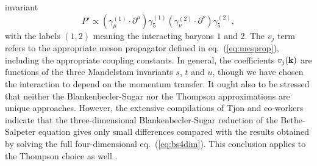 invariant
\begin{equation}
  P'\propto (\gamma_{\mu}^{(1)}\cdot \partial^{\mu})\gamma_5^{(1)}
(\gamma_{\nu}^{(2)}\cdot \partial^{\nu})\gamma_5^{(2)},
\end{equation}
with the labels $(1,2)$ meaning
the interacting baryons $1$ and $2$. The $v_j$ term
refers to the appropriate meson
propagator defined in eq.\ (\ref{eq:mesprop}), including the appropriate
coupling constants. In general, the coefficients $v_j({\bf k})$ are functions
of the three Mandelstam invariants $s$, $t$ and $u$,
though we have chosen the interaction
to depend on the momentum transfer.
It ought also to be stressed that neither the Blankenbecler-Sugar nor the
Thompson approximations are unique approaches. However, the
extensive compilations of Tjon and co-workers \cite{zt81} indicate that
the three-dimensional Blankenbecler-Sugar 
reduction of the Bethe-Salpeter equation gives
only small differences compared 
with the results obtained by solving the full four-dimensional
eq.\ (\ref{eq:bs4dim}). This conclusion applies to the Thompson choice as well
\cite{mac89,bm90}.

